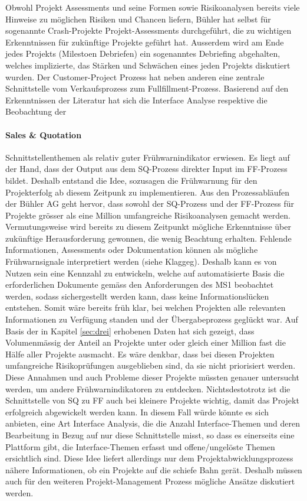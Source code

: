 \newline
Obwohl Projekt Assessments und seine Formen sowie Risikoanalysen bereits viele Hinweise zu möglichen Risiken und Chancen liefern, Bühler hat selbst für sogenannte Crash-Projekte Projekt-Assessments durchgeführt, die zu wichtigen Erkenntnissen für zukünftige Projekte geführt hat. Ausserdem wird am Ende jedes Projekts (Milestoen Debriefen) ein sogenanntes Debriefing abgehalten, welches implizierte, das Stärken und Schwächen eines jeden Projekts diskutiert wurden. Der Customer-Project Prozess hat neben anderen eine zentrale Schnittstelle vom Verkaufsprozess zum Fullfillment-Prozess. Basierend auf den Erkenntnissen der Literatur hat sich die Interface Analyse respektive die Beobachtung der
\paragraph{Sales \& Quotation} Schnittstellenthemen als relativ guter Frühwarnindikator erwiesen. Es liegt auf der Hand, dass der Output aus dem SQ-Prozess direkter Input im FF-Prozess bildet. Deshalb entstand die Idee, sozusagen die Frühwarnung für den Projekterfolg ab diesem Zeitpunk zu implementieren. Aus den Prozessabläufen der Bühler AG geht hervor, dass sowohl der SQ-Prozess und der FF-Prozess für Projekte grösser als eine Million umfangreiche Risikoanalysen gemacht werden. Vermutungsweise wird bereits zu diesem Zeitpunkt mögliche Erkenntnisse über zukünftige Herausforderung gewonnen, die wenig Beachtung erhalten. Fehlende Informationen, Assessments oder Dokumentation können als mögliche Frühwarnsignale interpretiert werden (siehe Klaggeg). Deshalb kann es von Nutzen sein eine Kennzahl zu entwickeln, welche auf automatisierte Basis die erforderlichen Dokumente gemäss den Anforderungen des MS1 beobachtet werden, sodass sichergestellt werden kann, dass keine Informationslücken entstehen. Somit wäre bereits früh klar, bei welchen Projekten alle relevanten Informationen zu Verfügung standen und der Übergabeprozess geglückt war. Auf Basis der in Kapitel \ref{sec:drei} erhobenen Daten hat sich gezeigt, dass Volumenmässig der Anteil an Projekte unter oder gleich einer Million fast die Hälfe aller Projekte ausmacht. Es wäre denkbar, dass bei diesen Projekten umfangreiche Risikoprüfungen ausgeblieben sind, da sie nicht priorisiert werden. Diese Annahmen und auch Probleme dieser Projekte müssten genauer untersucht werden, um andere Frühwarnindikatoren zu entdecken. Nichtsdestotrotz ist die Schnittstelle von SQ zu FF auch bei kleinere Projekte wichtig, damit das Projekt erfolgreich abgewickelt werden kann. In diesem Fall würde könnte es sich anbieten, eine Art Interface Analysis, die die Anzahl Interface-Themen und deren Bearbeitung in Bezug auf nur diese Schnittstelle misst, so dass es einerseits eine Plattform gibt, die Interface-Themen erfasst und offene/ungelöste Themen ersichtlich sind. Diese Idee liefert allerdings nur dem Projektabwicklungsprozess nähere Informationen, ob ein Projekte auf die schiefe Bahn gerät. Deshalb müssen auch für den weiteren Projekt-Management Prozess mögliche Ansätze diskutiert werden.
